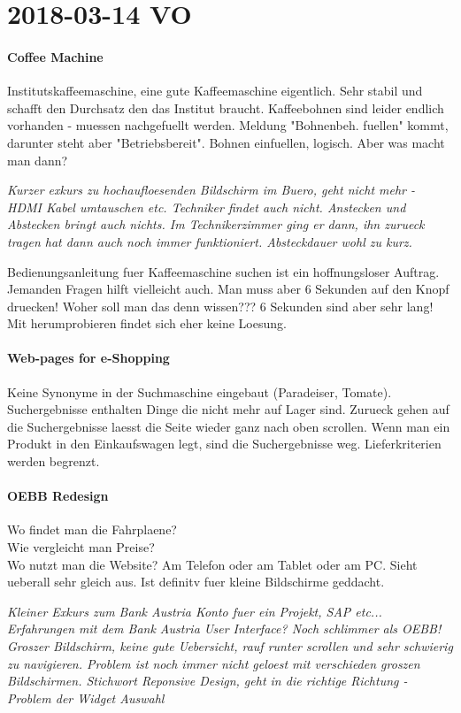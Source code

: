 \section{2018-03-14 VO}

\paragraph{Coffee Machine}
Institutskaffeemaschine, eine gute Kaffeemaschine eigentlich. 
Sehr stabil und schafft den Durchsatz den das Institut braucht.
Kaffeebohnen sind leider endlich vorhanden - muessen nachgefuellt werden.
Meldung "Bohnenbeh. fuellen" kommt, darunter steht aber "Betriebsbereit".
Bohnen einfuellen, logisch. Aber was macht man dann?

\textit{Kurzer exkurs zu hochaufloesenden Bildschirm im Buero, geht nicht mehr - HDMI Kabel
umtauschen etc. Techniker findet auch nicht. Anstecken und Abstecken bringt 
auch nichts. Im Technikerzimmer ging er dann, ihn zurueck tragen hat dann auch noch 
immer funktioniert. Absteckdauer wohl zu kurz.}

Bedienungsanleitung fuer Kaffeemaschine suchen ist ein hoffnungsloser Auftrag.
Jemanden Fragen hilft vielleicht auch. Man muss aber 6 Sekunden auf den Knopf druecken!
Woher soll man das denn wissen??? 6 Sekunden sind aber sehr lang! Mit herumprobieren
findet sich eher keine Loesung. 

\paragraph{Web-pages for e-Shopping}
Keine Synonyme in der Suchmaschine eingebaut (Paradeiser, Tomate).
Suchergebnisse enthalten Dinge die nicht mehr auf Lager sind.
Zurueck gehen auf die Suchergebnisse laesst die Seite wieder ganz nach oben scrollen.
Wenn man ein Produkt in den Einkaufswagen legt, sind die Suchergebnisse weg.
Lieferkriterien werden begrenzt.

\paragraph{OEBB Redesign}
Wo findet man die Fahrplaene?\\
Wie vergleicht man Preise?\\

Wo nutzt man die Website? Am Telefon oder am Tablet oder am PC. Sieht ueberall
sehr gleich aus. Ist definitv fuer kleine Bildschirme geddacht. 

\textit{Kleiner Exkurs zum Bank Austria Konto fuer ein Projekt, SAP etc... Erfahrungen
mit dem Bank Austria User Interface? Noch schlimmer als OEBB! Groszer Bildschirm, 
keine gute Uebersicht, rauf runter scrollen und sehr schwierig zu navigieren. 
Problem ist noch immer nicht geloest mit verschieden groszen Bildschirmen. Stichwort
Reponsive Design, geht in die richtige Richtung - Problem der Widget Auswahl}

